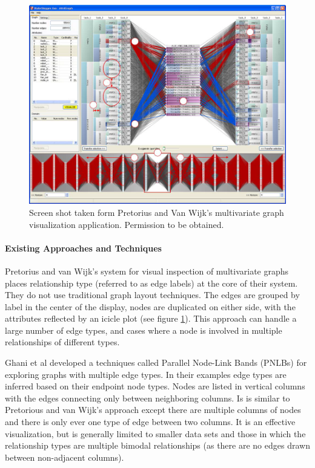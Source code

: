 \begin{figure}[htb]
  \centering
  \includegraphics[width=0.95\columnwidth]{figures/MultivariateViz}
  \caption{\label{fig:MultivariateViz} Screen shot taken form Pretorius and Van Wijk's \cite{pretorius2008} multivariate graph visualization application. Permission to be obtained. }
\end{figure}

\paragraph*{Existing Approaches and Techniques}

Pretorius and van Wijk's \cite{pretorius2008} system for visual inspection of multivariate graphs places relationship type (referred to as edge labels) at the core of their system.
They do not use traditional graph layout techniques.
The edges are grouped by label in the center of the display, nodes are duplicated on either side, with the attributes reflected by an icicle plot (see figure \ref{fig:MultivariateViz}).
This approach can handle a large number of edge types, and cases where a node is involved in multiple relationships of different types.

Ghani et al \cite{Ghani2013} developed a techniques called Parallel Node-Link Bands (PNLBs) for exploring graphs with multiple edge types. In their examples edge types are inferred based on their endpoint node types. Nodes are listed in vertical columns with the edges connecting only between neighboring columns.
Is is similar to Pretorious and van Wijk's approach except there are multiple columns of nodes and there is only ever one type of edge between two columns. It is an effective visualization, but is generally limited to smaller data sets and those in which the relationship types are multiple bimodal relationships (as there are no edges drawn between non-adjacent columns).

